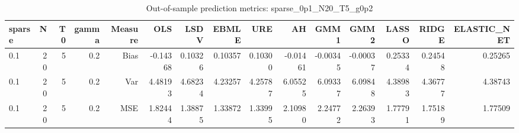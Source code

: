\begin{table}[!htbp]\centering
\caption{Out-of-sample prediction metrics: sparse_0p1_N20_T5_g0p2}
\label{tab:table3_sparse_0p1_N20_T5_g0p2}
\begin{tabular}{lrrrrrrrrrrrrrr}
\hline
sparse & N & T0 & gamma & Measure & OLS & LSDV & EBMLE & URE & AH & GMM1 & GMM2 & LASSO & RIDGE & ELASTIC_NET \\
\hline
0.1 & 20 & 5 & 0.2 & Bias & -0.14368 & 0.10326 & 0.10357 & 0.10300 & -0.01461 & -0.00345 & -0.00037 & 0.25334 & 0.24548 & 0.25265 \\
0.1 & 20 & 5 & 0.2 & Var & 4.48193 & 4.68234 & 4.23257 & 4.25787 & 6.05525 & 6.09337 & 6.09848 & 4.38983 & 4.36777 & 4.38743 \\
0.1 & 20 & 5 & 0.2 & MSE & 1.82444 & 1.38875 & 1.33872 & 1.33995 & 2.10980 & 2.24772 & 2.26393 & 1.77791 & 1.75189 & 1.77509 \\
\hline
\end{tabular}
\end{table}

